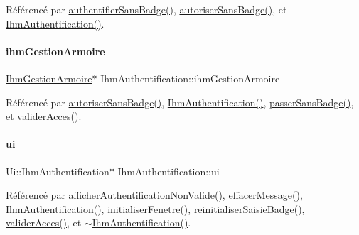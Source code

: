 Référencé par \hyperlink{class_ihm_authentification_af7427fc32a32954401a8792f5672ad19}{authentifier\+Sans\+Badge()}, \hyperlink{class_ihm_authentification_add8f8e7a0fbf70cef9399ba9f7db7b7e}{autoriser\+Sans\+Badge()}, et \hyperlink{class_ihm_authentification_a09e60cbdf8d1377e17d940463acb75ba}{Ihm\+Authentification()}.

\mbox{\label{class_ihm_authentification_a6ce06a3dbea8b929c3ddffdba011c01f}} 
\paragraph{\texorpdfstring{ihm\+Gestion\+Armoire}{ihmGestionArmoire}}
{\footnotesize\ttfamily \hyperlink{class_ihm_gestion_armoire}{Ihm\+Gestion\+Armoire}$\ast$ Ihm\+Authentification\+::ihm\+Gestion\+Armoire\hspace{0.3cm}{\ttfamily [private]}}



Référencé par \hyperlink{class_ihm_authentification_add8f8e7a0fbf70cef9399ba9f7db7b7e}{autoriser\+Sans\+Badge()}, \hyperlink{class_ihm_authentification_a09e60cbdf8d1377e17d940463acb75ba}{Ihm\+Authentification()}, \hyperlink{class_ihm_authentification_a6a67fe1c8e354a9ad123d8c53c16c6c4}{passer\+Sans\+Badge()}, et \hyperlink{class_ihm_authentification_ad62f646310fff597d3bf50af2c3d5d0c}{valider\+Acces()}.

\mbox{\label{class_ihm_authentification_a2bab782e7f65474f2817c3916ded9d18}} 
\paragraph{\texorpdfstring{ui}{ui}}
{\footnotesize\ttfamily Ui\+::\+Ihm\+Authentification$\ast$ Ihm\+Authentification\+::ui\hspace{0.3cm}{\ttfamily [private]}}



Référencé par \hyperlink{class_ihm_authentification_a91a8934658e317870fb6b931608824db}{afficher\+Authentification\+Non\+Valide()}, \hyperlink{class_ihm_authentification_a67dcacabc50a01245badd2d9268253a4}{effacer\+Message()}, \hyperlink{class_ihm_authentification_a09e60cbdf8d1377e17d940463acb75ba}{Ihm\+Authentification()}, \hyperlink{class_ihm_authentification_a4698f8d828773e365104d78e3ac3b9ce}{initialiser\+Fenetre()}, \hyperlink{class_ihm_authentification_afa429a3de1da16117b7ce4c9d8f40160}{reinitialiser\+Saisie\+Badge()}, \hyperlink{class_ihm_authentification_ad62f646310fff597d3bf50af2c3d5d0c}{valider\+Acces()}, et \hyperlink{class_ihm_authentification_aa48bdda8dd131164c79ae4cc8b350320}{$\sim$\+Ihm\+Authentification()}.

